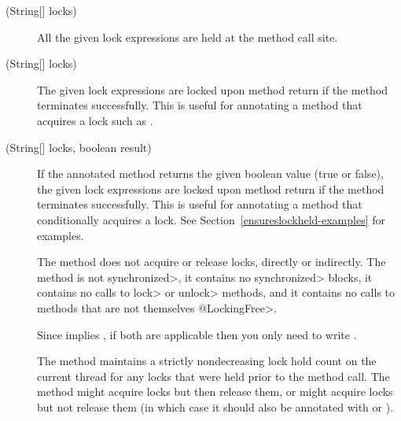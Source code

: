 \begin{sloppypar}
\begin{description}
\item[\small{(String[] locks)}]
  All the given lock expressions
  are held at the method call site.

\item[\small{(String[] locks)}]
  The given lock
  expressions are
  locked upon method return if the method
  terminates successfully.  This is useful for annotating a
  method that acquires a lock such as
  .

\item[\small{(String[] locks, boolean result)}]
  If the annotated method returns the given
  boolean value (true or false), the given lock
  expressions are locked upon method return if the method
  terminates successfully.
  This is useful for annotating a
  method that conditionally acquires a lock.
  See Section~\ref{ensureslockheld-examples} for examples.

\end{description}


\begin{description}

\item[]
  The method does not acquire or release locks,
  directly or indirectly.  The method is not \<synchronized>, it contains
  no \<synchronized> blocks, it contains no calls to \<lock> or \<unlock>
  methods, and it contains no calls to methods that are not themselves \<@LockingFree>.

  Since
   implies , if both are applicable
  then you only need to write .

\item[]
  The method maintains a strictly nondecreasing lock hold count on the
  current thread for any locks that were held prior
  to the method call.  The method might acquire locks but then release
  them, or might acquire locks but not release them (in which case it should
  also be annotated with
   or
  ).


\end{description}
\end{sloppypar}
